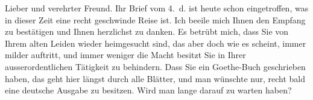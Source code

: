 \pstart\center{}Lieber und verehrter Freund.\pend\vspace{0.5em}
\pstart
           Ihr Brief vom 4. d. ist heute schon eingetroffen, was in dieser Zeit
               eine recht geschwinde Reise ist. Ich beeile mich Ihnen den Empfang zu bestätigen und
               Ihnen herzlichst zu danken. Es betrübt mich, dass Sie von Ihrem alten Leiden wieder
               heimgesucht sind, das aber doch wie es scheint, immer milder auftritt, und immer
               weniger die Macht besitzt Sie in Ihrer ausserordentlichen Tätigkeit zu behindern.
               Dass Sie ein Goethe-Buch geschrieben haben, das
               geht hier längst durch alle Blätter, und man wünschte nur, recht bald eine deutsche
               Ausgabe zu besitzen. Wird man lange darauf zu warten haben?\pend
           
